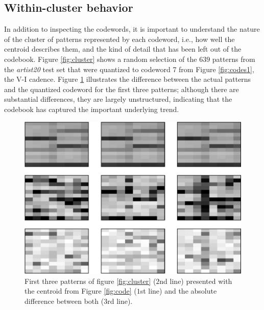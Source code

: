 \documentclass{article}
\newcommand{\ie}{i.e.~}
\begin{document}
\subsection{Within-cluster behavior}
In addition to inspecting the codewords, it is important to understand 
the nature of the cluster of patterns represented by each codeword, i.e., 
how well the centroid describes them, and the kind of detail that has 
been left out of the codebook.  Figure \ref{fig:cluster} shows a random 
selection of the $639$ patterns from the {\it artist20} test set that 
were quantized to codeword 7 from Figure \ref{fig:codes1}, the V-I cadence. 
Figure \ref{fig:cluster_diff} illustrates the difference between the actual 
patterns and the quantized codeword for the first three patterns; although 
there are substantial differences, they are largely unstructured, indicating 
that the codebook has captured the important underlying trend.




\begin{figure}[htb]
\begin{center}
\includegraphics[width=.8\columnwidth]{close_patterns_diff}
\end{center}
\caption{\small{First three patterns of figure \ref{fig:cluster}
($2$nd line) presented with the centroid from Figure \ref{fig:code}
($1$st line) and the absolute difference between both ($3$rd line).
}}
\label{fig:cluster_diff}
\end{figure}
\end{document}
